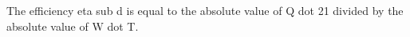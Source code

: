 The efficiency eta sub d is equal to the absolute value of Q dot 21 divided by the absolute value of W dot T.
